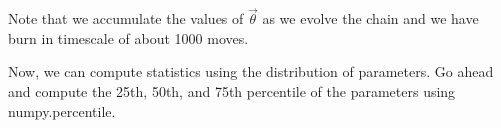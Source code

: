 Note that we accumulate the values of $\vec{\theta}$ as we evolve the chain and we have burn in timescale of about 1000 moves.

Now, we can compute statistics using the distribution of parameters.  Go ahead and compute the 25th, 50th, and 75th percentile of the parameters using numpy.percentile.

%





